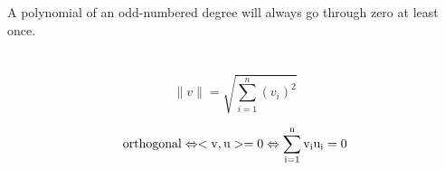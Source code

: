 \documentclass{report}
\begin{document}
A polynomial of an odd-numbered degree will always go through zero at least once.

\section{}

\subsection{}

\subsection{}

\chapter{}

\chapter{}

\chapter{}

\chapter{}

\chapter{}

\chapter{}

\chapter{}

\section{}

\label{norm}$$\|v\|=\sqrt{\sum_{i=1}^n(v_i)^2}$$

$$\rm{orthogonal }\Leftrightarrow <v,u> = 0 \Leftrightarrow \sum_{i=1}^nv_iu_i=0$$
\end{document}
